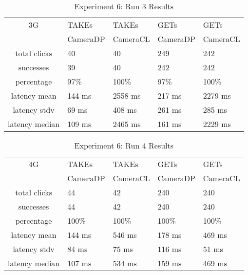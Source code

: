 \begin{table}[htb]
\begin{scriptsize} 
\caption{Experiment 6: Run 3 Results} 
\label{table:exp-6-run3-results}
 \begin{center}
 \begin{tabular}{| c | p{1.5cm} | p{1.5cm} | p{1.5cm} | p{1.4cm} |}
  \hline
  3G & TAKEs & TAKEs & GETs & GETs \\
  & CameraDP & CameraCL & CameraDP & CameraCL \\
  \hline
  total clicks & 40 & 40 & 249 & 242 \\
  \hline
  successes & 39 & 40 & 242 & 242 \\
  \hline
  percentage & 97\% & 100\% & 97\% & 100\% \\
  \hline
  latency mean & 144 ms & 2558 ms & 217 ms & 2279 ms \\
  \hline
  latency stdv & 69 ms & 408 ms & 261 ms & 285 ms \\
  \hline
  latency median & 109 ms & 2465 ms & 161 ms & 2229 ms \\
  \hline
  \end{tabular}

  \end{center}
\end{scriptsize}
\end{table}
\begin{table}[htb]
\begin{scriptsize} 
\caption{Experiment 6: Run 4 Results} 
\label{table:exp-6-run4-results}
 \begin{center}
 \begin{tabular}{| c | p{1.5cm} | p{1.5cm} | p{1.5cm} | p{1.4cm} |}
  \hline
  4G & TAKEs & TAKEs & GETs & GETs \\
  & CameraDP & CameraCL & CameraDP & CameraCL \\
  \hline
  total clicks & 44 & 42 & 240 &  240 \\
  \hline
  successes & 44 & 42 & 240 & 240 \\
  \hline
  percentage & 100\% & 100\% & 100\% & 100\% \\
  \hline
  latency mean & 144 ms & 546 ms & 178 ms & 469 ms \\
  \hline
  latency stdv & 84 ms & 75 ms & 116 ms & 51 ms \\
  \hline
  latency median & 107 ms & 534 ms & 159 ms & 469 ms \\
  \hline
  \end{tabular}
  \end{center}
\end{scriptsize}
\end{table}


